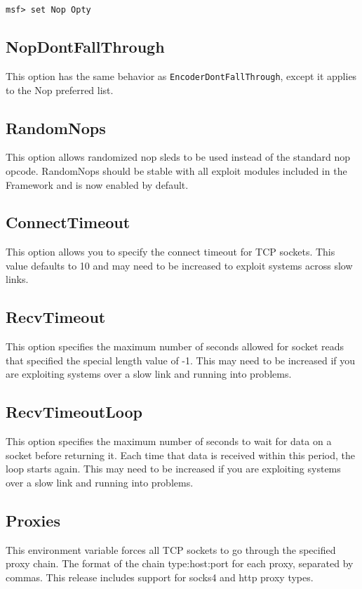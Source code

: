 \documentclass{report}
\begin{document}
\begin{verbatim}
msf> set Nop Opty
\end{verbatim}

	\subsection{NopDontFallThrough}
\par
This option has the same behavior as \texttt{EncoderDontFallThrough}, except it
applies to the Nop preferred list. 

	\subsection{RandomNops}
\par
This option allows randomized nop sleds to be used instead of the standard nop
opcode. RandomNops should be stable with all exploit modules included in the
Framework and is now enabled by default. 

	\subsection{ConnectTimeout}
\par
This option allows you to specify the connect timeout for TCP sockets. This
value defaults to 10 and may need to be increased to exploit systems across slow links. 

	\subsection{RecvTimeout}
\par
This option specifies the maximum number of seconds allowed for socket reads
that specified the special length value of -1. This may need to be increased if
you are exploiting systems over a slow link and running into problems. 

	\subsection{RecvTimeoutLoop}
\par
This option specifies the maximum number of seconds to wait for data on a socket
before returning it. Each time that data is received within this period, the
loop starts again. This may need to be increased if you are exploiting systems
over a slow link and running into problems.  

	\subsection{Proxies}
\par
This environment variable forces all TCP sockets to go through the specified
proxy chain. The format of the chain type:host:port for each proxy, separated by
commas. This release includes support for socks4 and http proxy types. 
\end{document}
